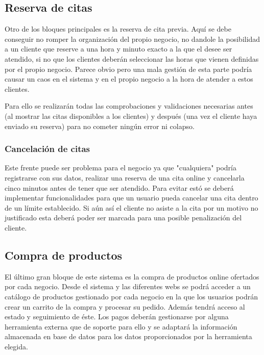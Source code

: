 \subsection{Reserva de citas}

Otro de los bloques principales es la reserva de cita previa. Aquí se debe conseguir no romper la organización del propio negocio, no dandole la posibilidad a un cliente que reserve a una hora y minuto exacto a la que el desee ser atendido, si no que los clientes deberán seleccionar las horas que vienen definidas por el propio negocio. Parece obvio pero una mala gestión de esta parte podría causar un caos en el sistema y en el propio negocio a la hora de atender a estos clientes.

Para ello se realizarán todas las comprobaciones y validaciones necesarias antes (al mostrar las citas disponibles a los clientes) y después (una vez el cliente haya enviado su reserva) para no cometer ningún error ni colapso.

\subsubsection{Cancelación de citas}

Este frente puede ser problema para el negocio ya que "cualquiera" podría registrarse con sus datos, realizar una reserva de una cita online y cancelarla cinco minutos antes de tener que ser atendido. Para evitar estó se deberá implementar funcionalidades para que un usuario pueda cancelar una cita dentro de un límite establecido. Si aún así el cliente no asiste a la cita por un motivo no justificado esta deberá poder ser marcada para una posible penalización del cliente.

\subsection{Compra de productos}

El último gran bloque de este sistema es la compra de productos online ofertados por cada negocio. Desde el sistema y las diferentes webs se podrá acceder a un catálogo de productos gestionado por cada negocio en la que los usuarios podrán crear un carrito de la compra y procesar su pedido. Además tendrá acceso al estado y seguimiento de éste. Los pagos deberán gestionarse por alguna herramienta externa que de soporte para ello y se adaptará la información almacenada en base de datos para los datos proporcionados por la herramienta elegida.

